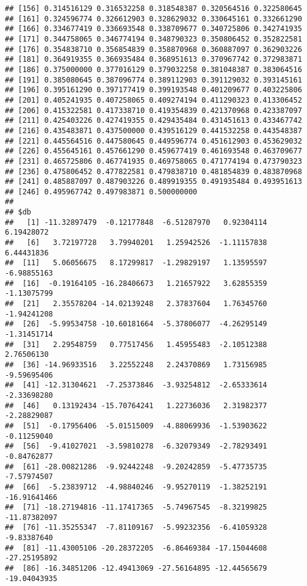 \documentclass[]{article}
\begin{document}
\begin{verbatim}
## [156] 0.314516129 0.316532258 0.318548387 0.320564516 0.322580645
## [161] 0.324596774 0.326612903 0.328629032 0.330645161 0.332661290
## [166] 0.334677419 0.336693548 0.338709677 0.340725806 0.342741935
## [171] 0.344758065 0.346774194 0.348790323 0.350806452 0.352822581
## [176] 0.354838710 0.356854839 0.358870968 0.360887097 0.362903226
## [181] 0.364919355 0.366935484 0.368951613 0.370967742 0.372983871
## [186] 0.375000000 0.377016129 0.379032258 0.381048387 0.383064516
## [191] 0.385080645 0.387096774 0.389112903 0.391129032 0.393145161
## [196] 0.395161290 0.397177419 0.399193548 0.401209677 0.403225806
## [201] 0.405241935 0.407258065 0.409274194 0.411290323 0.413306452
## [206] 0.415322581 0.417338710 0.419354839 0.421370968 0.423387097
## [211] 0.425403226 0.427419355 0.429435484 0.431451613 0.433467742
## [216] 0.435483871 0.437500000 0.439516129 0.441532258 0.443548387
## [221] 0.445564516 0.447580645 0.449596774 0.451612903 0.453629032
## [226] 0.455645161 0.457661290 0.459677419 0.461693548 0.463709677
## [231] 0.465725806 0.467741935 0.469758065 0.471774194 0.473790323
## [236] 0.475806452 0.477822581 0.479838710 0.481854839 0.483870968
## [241] 0.485887097 0.487903226 0.489919355 0.491935484 0.493951613
## [246] 0.495967742 0.497983871 0.500000000
## 
## $db
##   [1] -11.32897479  -0.12177848  -6.51287970   0.92304114   6.19428072
##   [6]   3.72197728   3.79940201   1.25942526  -1.11157838   6.44431836
##  [11]   5.06056675   8.17299817  -1.29829197   1.13595597  -6.98855163
##  [16]  -0.19164105 -16.28406673   1.21657922   3.62855359  -1.13075799
##  [21]   2.35578204 -14.02139248   2.37837604   1.76345760  -1.94241208
##  [26]  -5.99534758 -10.60181664  -5.37806077  -4.26295149  -1.31451714
##  [31]   2.29548759   0.77517456   1.45955483  -2.10512388   2.76506130
##  [36] -14.96933516   3.22552248   2.24370869   1.73156985  -9.59695406
##  [41] -12.31304621  -7.25373846  -3.93254812  -2.65333614  -2.33698280
##  [46]   0.13192434 -15.70764241   1.22736036   2.31982377  -2.28829087
##  [51]  -0.17956406  -5.01515009  -4.88069936  -1.53903622  -0.11259040
##  [56]  -9.41027021  -3.59810278  -6.32079349  -2.78293491  -0.84762877
##  [61] -28.00821286  -9.92442248  -9.20242859  -5.47735735  -7.57974507
##  [66]  -5.23839712  -4.98840246  -9.95270119  -1.38252191 -16.91641466
##  [71] -18.27194816 -11.17417365  -5.74967545  -8.32199825 -11.87382097
##  [76] -11.35255347  -7.81109167  -5.99232356  -6.41059328  -9.83387640
##  [81] -11.43005106 -20.28372205  -6.86469384 -17.15044608 -27.25195892
##  [86] -16.34851206 -12.49413069 -27.56164895 -12.44565679 -19.04043935

\end{verbatim}
\end{document}
